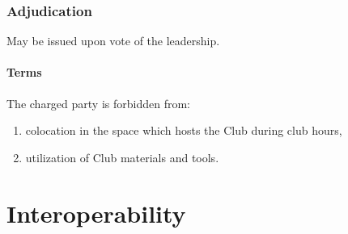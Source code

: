 \documentclass[12pt]{article}
\begin{document}
\subsubsection{Adjudication}
May be issued upon vote of the leadership.
\paragraph{Terms}
The charged party is forbidden from: 
\begin{enumerate}[label=(\roman*)]
    \item colocation in the space which hosts the Club during club hours,
    \item utilization of Club materials and tools.
\end{enumerate}
\section{Interoperability}
\end{document}
